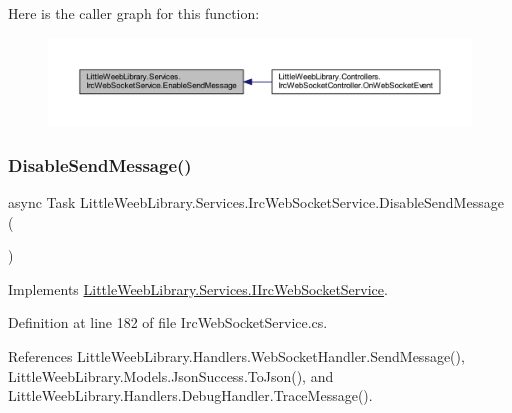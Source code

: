 Here is the caller graph for this function\+:\nopagebreak
\begin{figure}[H]
\begin{center}
\leavevmode
\includegraphics[width=350pt]{class_little_weeb_library_1_1_services_1_1_irc_web_socket_service_acd9aa44a2389caa8e997db49a646c448_icgraph}
\end{center}
\end{figure}
\mbox{\label{class_little_weeb_library_1_1_services_1_1_irc_web_socket_service_a71f89c2a8e9b0a86972d192bc3e55318}} 
\subsubsection{\texorpdfstring{Disable\+Send\+Message()}{DisableSendMessage()}}
{\footnotesize\ttfamily async Task Little\+Weeb\+Library.\+Services.\+Irc\+Web\+Socket\+Service.\+Disable\+Send\+Message (\begin{DoxyParamCaption}{ }\end{DoxyParamCaption})}



Implements \mbox{\hyperlink{interface_little_weeb_library_1_1_services_1_1_i_irc_web_socket_service_a68ae0e96a4de9e8ad3c43f4dd89546b8}{Little\+Weeb\+Library.\+Services.\+I\+Irc\+Web\+Socket\+Service}}.



Definition at line 182 of file Irc\+Web\+Socket\+Service.\+cs.



References Little\+Weeb\+Library.\+Handlers.\+Web\+Socket\+Handler.\+Send\+Message(), Little\+Weeb\+Library.\+Models.\+Json\+Success.\+To\+Json(), and Little\+Weeb\+Library.\+Handlers.\+Debug\+Handler.\+Trace\+Message().




